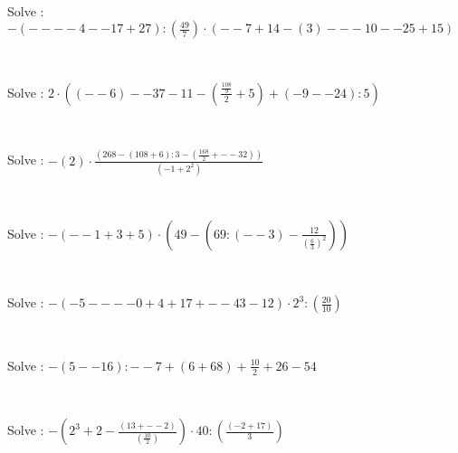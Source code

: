 \documentclass[english,course]{lecture}
\begin{document}
\begin{enumerate}
\begin{minipage}{\linewidth}
\end{minipage} \\
\begin{minipage}{\linewidth}
\item Solve : \(-\left(----4--17+27\right):\left(\frac{49}{7}\right) \cdot \left(--7+14-\left(3\right)---10--25+15\right)\)
\end{minipage} \\
\begin{minipage}{\linewidth}
\item Solve : \(2 \cdot \left(\left(--6\right)--37-11-\left(\frac{\frac{108}{9}}{2}+5\right)+\left(-9--24\right):5\right)\)
\end{minipage} \\
\begin{minipage}{\linewidth}
\item Solve : \(-\left(2\right) \cdot \frac{\left(268-\left(108+6\right):3-\left(\frac{168}{2}+--32\right)\right)}{\left(-1+{2}^{2}\right)}\)
\end{minipage} \\
\begin{minipage}{\linewidth}
\item Solve : \(-\left(--1+3+5\right) \cdot \left(49-\left(69:\left(--3\right)-\frac{12}{{\left(\frac{6}{3}\right)}^{2}}\right)\right)\)
\end{minipage} \\
\begin{minipage}{\linewidth}
\item Solve : \(-\left(-5----0+4+17+--43-12\right) \cdot {2}^{3}:\left(\frac{20}{10}\right)\)
\end{minipage} \\
\begin{minipage}{\linewidth}
\item Solve : \(-\left(5--16\right):--7+\left(6+68\right)+\frac{10}{2}+26-54\)
\end{minipage} \\
\begin{minipage}{\linewidth}
\item Solve : \(-\left({2}^{3}+2-\frac{\left(13+--2\right)}{\left(\frac{10}{2}\right)}\right) \cdot 40:\left(\frac{\left(-2+17\right)}{3}\right)\)
\end{minipage} \\

\end{enumerate}
\end{document}
